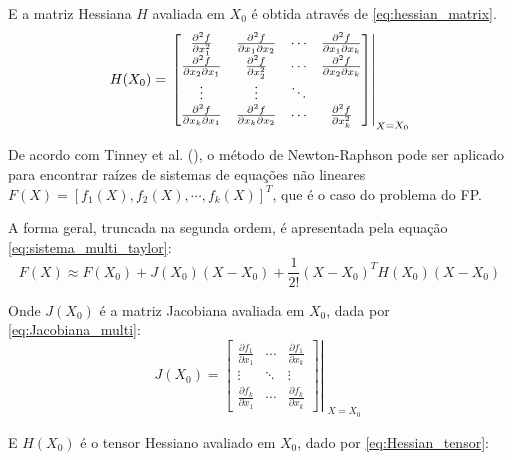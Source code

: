 E a matriz Hessiana $H$ avaliada em $X_0$ é obtida através de \eqref{eq:hessian_matrix}.
\begin{equation}\label{eq:hessian_matrix}
    H(X_0) = 
    \left.
\begin{bmatrix}
\frac{\partial^2 f}{\partial x_1^2} & \frac{\partial^2 f}{\partial x_1 \partial x_2} & \cdots & \frac{\partial^2 f}{\partial x_1 \partial x_k} \\
\frac{\partial^2 f}{\partial x_2 \partial x_1} & \frac{\partial^2 f}{\partial x_2^2} & \cdots & \frac{\partial^2 f}{\partial x_2 \partial x_k} \\
\vdots & \vdots & \ddots \\
\frac{\partial^2 f}{\partial x_k \partial x_1} & \frac{\partial^2 f}{\partial x_k \partial x_2} & \cdots & \frac{\partial^2 f}{\partial x_k^2} \\
\end{bmatrix} 
\right|_{\substack X = X_0}
\end{equation}

De acordo com Tinney et al. (\citeyear{NewtonRaphson}), o método de Newton-Raphson pode ser aplicado para encontrar raízes de sistemas de equações não lineares
$F(X) = [f_1(X), f_2(X),\cdots,f_k(X)]^T$, que é o caso do problema do \acs{FP}.

A forma geral, truncada na segunda ordem, é apresentada pela equação \eqref{eq:sistema_multi_taylor}:
\begin{equation}\label{eq:sistema_multi_taylor}
    F(X) \approx F(X_0) + J(X_0)(X-X_0) + \frac{1}{2!}(X-X_0)^T H(X_0)(X-X_0)
\end{equation}

Onde $J(X_0)$ é a matriz Jacobiana avaliada em $X_0$, dada por \eqref{eq:Jacobiana_multi}:
\begin{equation}\label{eq:Jacobiana_multi}
    J(X_0)= 
    \left. 
    \begin{bmatrix}
    \frac{\partial f_1}{\partial x_1} & \cdots & \frac{\partial f_1}{\partial x_k} \\
    \vdots & \ddots & \vdots \\
    \frac{\partial f_k}{\partial x_1} & \cdots & \frac{\partial f_k}{\partial x_k} 
    \end{bmatrix}
    \right|_{\substack{X = X_0}}
\end{equation}

E $H(X_0)$ é o tensor Hessiano avaliado em $X_0$, dado por \eqref{eq:Hessian_tensor}:

